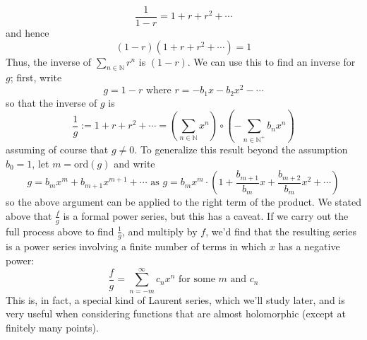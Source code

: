 \documentclass{article}
\newcommand*{\N}{\mathbb{N}}
\begin{document}
    $$ \frac{1}{1 - r} = 1 + r + r^2 + \cdots $$
and hence
    $$ (1 - r)(1 + r + r^2 + \cdots) = 1 $$
Thus, the inverse of $ \sum_{n \in \N} r^n $ is $ (1 - r) $. We can use this to find an inverse for $ g $; first, write
    $$ g = 1 - r \text{ where } r = - b_1 x - b_2 x^2 - \cdots $$
so that the inverse of $ g $ is
    $$ \frac{1}{g} := 1 + r + r^2 + \cdots = \left( \sum_{n \in \N} x^n \right) \circ \left( - \sum_{n \in \N^+} b_n x^n \right) $$
assuming of course that $ g \neq 0 $. To generalize this result beyond the assumption $ b_0 = 1 $, let $ m = \text{ord}(g) $ and write
    $$ g = b_m x^m + b_{m + 1} x^{m + 1} + \cdots \text{ as } g = b_m x^m \cdot \left( 1 + \frac{b_{m + 1}}{b_m} x + \frac{b_{m + 2}}{b_m} x^2 + \cdots \right) $$
so the above argument can be applied to the right term of the product. We stated above that $ \frac{f}{g} $ is a formal power series, but this has a caveat. If we carry out the full process above to find $ \frac{1}{g} $, and multiply by $ f $, we'd find that the resulting series is a power series involving a finite number of terms in which $ x $ has a negative power:
    $$ \frac{f}{g} = \sum_{n = -m}^\infty c_n x^n \text{ for some } m \text{ and } c_n $$
This is, in fact, a special kind of Laurent series, which we'll study later, and is very useful when considering functions that are almost holomorphic (except at finitely many points).
\end{document}
